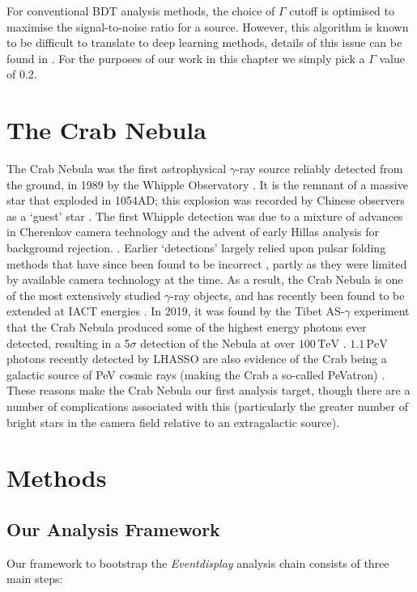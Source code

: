 For conventional BDT analysis methods, the choice of $\Gamma$ cutoff is optimised to maximise the signal-to-noise ratio for a source. However, this algorithm is known to be difficult to translate to deep learning methods, details of this issue can be found in \cite{Shilon}. For the purposes of our work in this chapter we simply pick a $\Gamma$ value of 0.2.

\section{The Crab Nebula}
The Crab Nebula was the first astrophysical $\gamma$-ray source reliably detected from the ground, in 1989 by the Whipple Observatory \cite{weekestev}. It is the remnant of a massive star that exploded in 1054AD; this explosion was recorded by Chinese observers as a `guest' star \cite{lhassocrab}. The first Whipple detection was due to a mixture of advances in Cherenkov camera technology and the advent of early Hillas analysis for background rejection. \cite{hillasparams}. Earlier `detections' largely relied upon pulsar folding methods that have since been found to be incorrect \cite{paulathesis}, partly as they were limited by available camera technology at the time. As a result, the Crab Nebula is one of the most extensively studied $\gamma$-ray objects, and has recently been found to be extended at IACT energies \cite{holler}. In 2019, it was found by the Tibet AS-$\gamma$ experiment that the Crab Nebula produced some of the highest energy photons ever detected, resulting in a 5$\sigma$ detection of the Nebula at over $\mathrm{100\,TeV}$ \cite{asgamma}. $\mathrm{1.1\,PeV}$ photons recently detected by LHASSO are also evidence of the Crab being a galactic source of PeV cosmic rays (making the Crab a so-called PeVatron) \cite{lhassocrab}. These reasons make the Crab Nebula our first analysis target, though there are a number of complications associated with this (particularly the greater number of bright stars in the camera field relative to an extragalactic source).

\section{Methods}
\subsection{Our Analysis Framework}
Our framework to bootstrap the \textit{Eventdisplay} analysis chain consists of three main steps:


